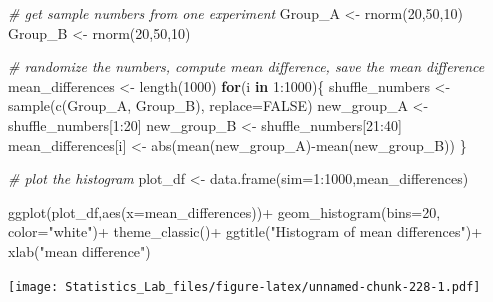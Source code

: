 \documentclass[
]{book}
\newenvironment{Shaded}{\begin{snugshade}}{\end{snugshade}}
\newcommand{\AttributeTok}[1]{\textcolor[rgb]{0.77,0.63,0.00}{#1}}
\newcommand{\CommentTok}[1]{\textcolor[rgb]{0.56,0.35,0.01}{\textit{#1}}}
\newcommand{\ConstantTok}[1]{\textcolor[rgb]{0.00,0.00,0.00}{#1}}
\newcommand{\ControlFlowTok}[1]{\textcolor[rgb]{0.13,0.29,0.53}{\textbf{#1}}}
\newcommand{\DecValTok}[1]{\textcolor[rgb]{0.00,0.00,0.81}{#1}}
\newcommand{\FunctionTok}[1]{\textcolor[rgb]{0.00,0.00,0.00}{#1}}
\newcommand{\NormalTok}[1]{#1}
\newcommand{\OtherTok}[1]{\textcolor[rgb]{0.56,0.35,0.01}{#1}}
\newcommand{\SpecialCharTok}[1]{\textcolor[rgb]{0.00,0.00,0.00}{#1}}
\newcommand{\StringTok}[1]{\textcolor[rgb]{0.31,0.60,0.02}{#1}}
\begin{document}
\begin{Shaded}
\begin{Highlighting}[]
\CommentTok{\# get sample numbers from one experiment}
\NormalTok{Group\_A }\OtherTok{\textless{}{-}} \FunctionTok{rnorm}\NormalTok{(}\DecValTok{20}\NormalTok{,}\DecValTok{50}\NormalTok{,}\DecValTok{10}\NormalTok{)}
\NormalTok{Group\_B }\OtherTok{\textless{}{-}} \FunctionTok{rnorm}\NormalTok{(}\DecValTok{20}\NormalTok{,}\DecValTok{50}\NormalTok{,}\DecValTok{10}\NormalTok{)}

\CommentTok{\# randomize the numbers, compute mean difference, save the mean difference}
\NormalTok{mean\_differences }\OtherTok{\textless{}{-}} \FunctionTok{length}\NormalTok{(}\DecValTok{1000}\NormalTok{)}
\ControlFlowTok{for}\NormalTok{(i }\ControlFlowTok{in} \DecValTok{1}\SpecialCharTok{:}\DecValTok{1000}\NormalTok{)\{}
\NormalTok{  shuffle\_numbers }\OtherTok{\textless{}{-}} \FunctionTok{sample}\NormalTok{(}\FunctionTok{c}\NormalTok{(Group\_A, Group\_B), }\AttributeTok{replace=}\ConstantTok{FALSE}\NormalTok{)}
\NormalTok{  new\_group\_A }\OtherTok{\textless{}{-}}\NormalTok{ shuffle\_numbers[}\DecValTok{1}\SpecialCharTok{:}\DecValTok{20}\NormalTok{]}
\NormalTok{  new\_group\_B }\OtherTok{\textless{}{-}}\NormalTok{ shuffle\_numbers[}\DecValTok{21}\SpecialCharTok{:}\DecValTok{40}\NormalTok{]}
\NormalTok{  mean\_differences[i] }\OtherTok{\textless{}{-}} \FunctionTok{abs}\NormalTok{(}\FunctionTok{mean}\NormalTok{(new\_group\_A)}\SpecialCharTok{{-}}\FunctionTok{mean}\NormalTok{(new\_group\_B))}
\NormalTok{\}}

\CommentTok{\# plot the histogram}
\NormalTok{plot\_df }\OtherTok{\textless{}{-}} \FunctionTok{data.frame}\NormalTok{(}\AttributeTok{sim=}\DecValTok{1}\SpecialCharTok{:}\DecValTok{1000}\NormalTok{,mean\_differences)}

\FunctionTok{ggplot}\NormalTok{(plot\_df,}\FunctionTok{aes}\NormalTok{(}\AttributeTok{x=}\NormalTok{mean\_differences))}\SpecialCharTok{+}
  \FunctionTok{geom\_histogram}\NormalTok{(}\AttributeTok{bins=}\DecValTok{20}\NormalTok{, }\AttributeTok{color=}\StringTok{"white"}\NormalTok{)}\SpecialCharTok{+}
  \FunctionTok{theme\_classic}\NormalTok{()}\SpecialCharTok{+}
  \FunctionTok{ggtitle}\NormalTok{(}\StringTok{"Histogram of mean differences"}\NormalTok{)}\SpecialCharTok{+}
  \FunctionTok{xlab}\NormalTok{(}\StringTok{"mean difference"}\NormalTok{)}
\end{Highlighting}
\end{Shaded}

\texttt{[image: Statistics\_Lab\_files/figure-latex/unnamed-chunk-228-1.pdf]}
\end{document}
